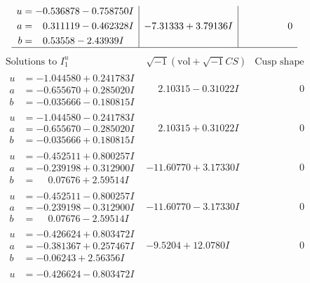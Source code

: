 \documentclass[1p]{elsarticle_modified}
\theoremstyle{definition}
\newcommand{\I}{\sqrt{-1}}
\begin{document}
$$\begin{array}{c|c|c}
\begin{aligned}
u &= -0.536878 - 0.758750 I \\
a &= \phantom{-}0.311119 - 0.462328 I \\
b &= \phantom{-}0.53558 - 2.43939 I\end{aligned}
 & -7.31333 + 3.79136 I & \phantom{-0.000000 } 0\\
 \hline 
 \end{array}$$\newpage$$\begin{array}{c|c|c}  
\text{Solutions to }I^u_{1}& \I (\text{vol} + \sqrt{-1}CS) & \text{Cusp shape}\\
 \hline 
\begin{aligned}
u &= -1.044580 + 0.241783 I \\
a &= -0.655670 + 0.285020 I \\
b &= -0.035666 - 0.180815 I\end{aligned}
 & \phantom{-}2.10315 - 0.31022 I & \phantom{-0.000000 } 0 \\ \hline\begin{aligned}
u &= -1.044580 - 0.241783 I \\
a &= -0.655670 - 0.285020 I \\
b &= -0.035666 + 0.180815 I\end{aligned}
 & \phantom{-}2.10315 + 0.31022 I & \phantom{-0.000000 } 0 \\ \hline\begin{aligned}
u &= -0.452511 + 0.800257 I \\
a &= -0.239198 + 0.312900 I \\
b &= \phantom{-}0.07676 + 2.59514 I\end{aligned}
 & -11.60770 + 3.17330 I & \phantom{-0.000000 } 0 \\ \hline\begin{aligned}
u &= -0.452511 - 0.800257 I \\
a &= -0.239198 - 0.312900 I \\
b &= \phantom{-}0.07676 - 2.59514 I\end{aligned}
 & -11.60770 - 3.17330 I & \phantom{-0.000000 } 0 \\ \hline\begin{aligned}
u &= -0.426624 + 0.803472 I \\
a &= -0.381367 + 0.257467 I \\
b &= -0.06243 + 2.56356 I\end{aligned}
 & -9.5204 + 12.0780 I & \phantom{-0.000000 } 0 \\ \hline\begin{aligned}
u &= -0.426624 - 0.803472 I \\

\end{aligned}
\end{array}$$
\end{document}
